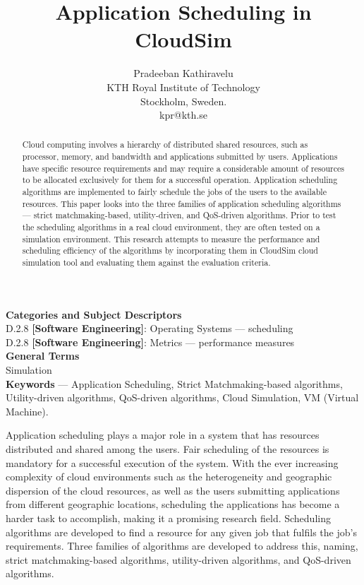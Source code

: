 \documentclass[times, 10pt,twocolumn]{article}
\begin{document}
\title{Application Scheduling in CloudSim}

\author{Pradeeban Kathiravelu\\
KTH Royal Institute of Technology\\
Stockholm, Sweden.\\ kpr@kth.se\\
}

\maketitle
\thispagestyle{empty}
\begin{abstract}
   Cloud computing involves a  hierarchy of distributed shared resources, such as processor, memory, and bandwidth and applications submitted by users. Applications have specific resource requirements and may require a considerable amount of resources to be allocated exclusively for them for a successful operation. Application scheduling algorithms are implemented to fairly schedule the jobs of the users to the available resources. This paper looks into the three families of application scheduling algorithms --- strict matchmaking-based, utility-driven, and QoS-driven algorithms. Prior to test the scheduling algorithms in a real cloud environment, they are often tested on a simulation environment. This research attempts to measure the performance and scheduling efficiency of the algorithms by incorporating them in CloudSim cloud simulation tool and evaluating them against the evaluation criteria. 
\end{abstract}


\textbf{Categories and Subject Descriptors}\\
D.2.8 \textbf{[Software Engineering]}: Operating Systems --- scheduling\\
D.2.8 \textbf{[Software Engineering]}: Metrics --- performance measures\\
\textbf{General Terms}\\
Simulation\\
\textbf{Keywords} ---  Application Scheduling, Strict Matchmaking-based algorithms, Utility-driven algorithms, QoS-driven algorithms, Cloud Simulation, VM (Virtual Machine).


Application scheduling plays a major role in a system that has resources distributed and shared among the users. Fair scheduling of the resources is mandatory for a successful execution of the system. With the ever increasing complexity of cloud environments such as the heterogeneity and geographic dispersion of the cloud resources, as well as the users submitting applications from different geographic locations, scheduling the applications has become a harder task to accomplish, making it a promising research field. Scheduling algorithms are developed to find a resource for any given job that fulfils the job's requirements. Three families of algorithms are developed to address this, naming, strict matchmaking-based algorithms, utility-driven algorithms, and QoS-driven algorithms.
\end{document}

